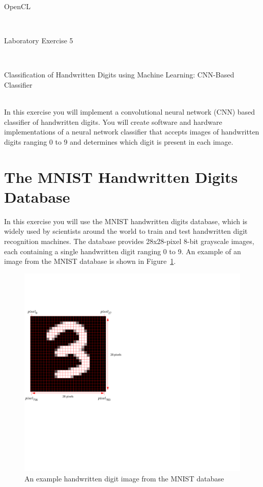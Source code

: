 \documentclass[epsfig,10pt,fullpage]{article}
\newcommand{\LabNum}{5}
\begin{document}
\centerline{\huge OpenCL}
~\\
\centerline{\huge Laboratory Exercise \LabNum}
~\\
\centerline{\large Classification of Handwritten Digits using Machine Learning: CNN-Based Classifier}
~\\

In this exercise you will implement a convolutional neural network (CNN) based classifier of handwritten digits.
You will create software and hardware implementations of a neural network classifier that accepts images of handwritten digits ranging 0 to 9 and determines which digit is present in each image. 

\section*{The MNIST Handwritten Digits Database}

In this exercise you will use the MNIST handwritten digits database,  
which is widely used by scientists around the world to train and test handwritten digit recognition machines. 
The database provides 28x28-pixel 8-bit grayscale images, each containing a single handwritten digit ranging 0 to 9. An example of
an image from the MNIST database is shown in Figure~\ref{fig:mnist_image}.

\begin{figure}[H]
   \begin{center}
       \hspace*{1.5cm}\includegraphics[scale=0.7]{figures/fig_mnist_image}
   \end{center}
   \caption{An example handwritten digit image from the MNIST database}
	\label{fig:mnist_image}
\end{figure}
\end{document}
